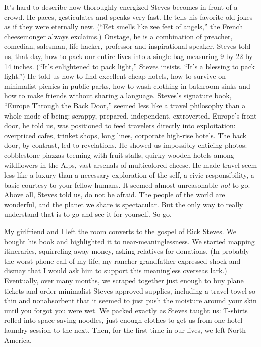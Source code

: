 It's hard to describe how thoroughly energized Steves becomes in front
of a crowd. He paces, gesticulates and speaks very fast. He tells his
favorite old jokes as if they were eternally new. (``Eet smells like zee
feet of angels,'' the French cheesemonger always exclaims.) Onstage, he
is a combination of preacher, comedian, salesman, life-hacker, professor
and inspirational speaker. Steves told us, that day, how to pack our
entire lives into a single bag measuring 9 by 22 by 14 inches. (``It's
enlightened to pack light,'' Steves insists. ``It's a blessing to pack
light.'') He told us how to find excellent cheap hotels, how to survive
on minimalist picnics in public parks, how to wash clothing in bathroom
sinks and how to make friends without sharing a language. Steves's
signature book, ``Europe Through the Back Door,'' seemed less like a
travel philosophy than a whole mode of being: scrappy, prepared,
independent, extroverted. Europe's front door, he told us, was
positioned to feed travelers directly into exploitation: overpriced
cafes, trinket shops, long lines, corporate high-rise hotels. The back
door, by contrast, led to revelations. He showed us impossibly enticing
photos: cobblestone piazzas teeming with fruit stalls, quirky wooden
hotels among wildflowers in the Alps, vast arsenals of multicolored
cheese. He made travel seem less like a luxury than a necessary
exploration of the self, a civic responsibility, a basic courtesy to
your fellow humans. It seemed almost unreasonable \emph{not} to go.
Above all, Steves told us, do not be afraid. The people of the world are
wonderful, and the planet we share is spectacular. But the only way to
really understand that is to go and see it for yourself. So go.

My girlfriend and I left the room converts to the gospel of Rick Steves.
We bought his book and highlighted it to near-meaninglessness. We
started mapping itineraries, squirreling away money, asking relatives
for donations. (In probably the worst phone call of my life, my rancher
grandfather expressed shock and dismay that I would ask him to support
this meaningless overseas lark.) Eventually, over many months, we
scraped together just enough to buy plane tickets and order minimalist
Steves-approved supplies, including a travel towel so thin and
nonabsorbent that it seemed to just push the moisture around your skin
until you forgot you were wet. We packed exactly as Steves taught us:
T-shirts rolled into space-saving noodles, just enough clothes to get us
from one hotel laundry session to the next. Then, for the first time in
our lives, we left North America.

